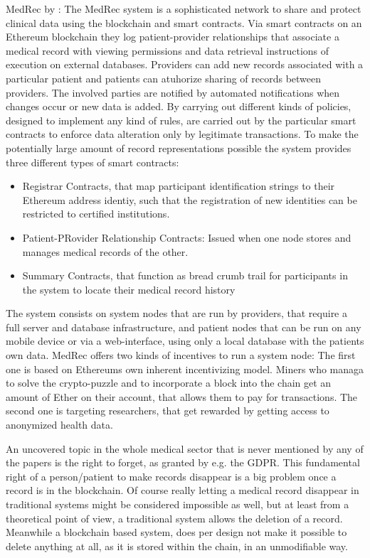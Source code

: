 MedRec by \citeauthor{Azaria2016}:
The MedRec system is a sophisticated network to share and protect clinical data using the blockchain and smart contracts. Via smart contracts on an Ethereum blockchain they log patient-provider relationships that associate a medical record with viewing permissions and data retrieval instructions of execution on external databases.
Providers can add new records associated with a particular patient and patients can atuhorize sharing of records between providers. The involved parties are notified by automated notifications when changes occur or new data is added.
By carrying out different kinds of policies, designed to implement any kind of rules, are carried out by the particular smart contracts to enforce data alteration only by legitimate transactions.
To make the potentially large amount of record representations possible the system provides three different types of smart contracts: 
\begin{itemize}
	\item Registrar Contracts, that map participant identification strings to their Ethereum address identiy, such that the registration of new identities can be restricted to certified institutions.
	\item Patient-PRovider Relationship Contracts: Issued when one node stores and manages medical records of the other.
	\item Summary Contracts, that function as bread crumb trail for participants in the system to locate their medical record history
\end{itemize}

The system consists on system nodes that are run by providers, that require a full server and database infrastructure, and patient nodes that can be run on any mobile device or via a web-interface, using only a local database with the patients own data.
MedRec offers two kinds of incentives to run a system node:
The first one is based on Ethereums own inherent incentivizing model. Miners who managa to solve the crypto-puzzle and to incorporate a block into the chain get an amount of Ether on their account, that allows them to pay for transactions.
The second one is targeting researchers, that get rewarded by getting access to anonymized health data.

An uncovered topic in the whole medical sector that is never mentioned by any of the papers is the right to forget, as granted by e.g. the GDPR. This fundamental right of a person/patient to make records disappear is a big problem once a record is in the blockchain. Of course really letting a medical record disappear in traditional systems might be considered impossible as well, but at least from a theoretical point of view, a traditional system allows the deletion of a record. Meanwhile a blockchain based system, does per design not make it possible to delete anything at all, as it is stored within the chain, in an unmodifiable way.

